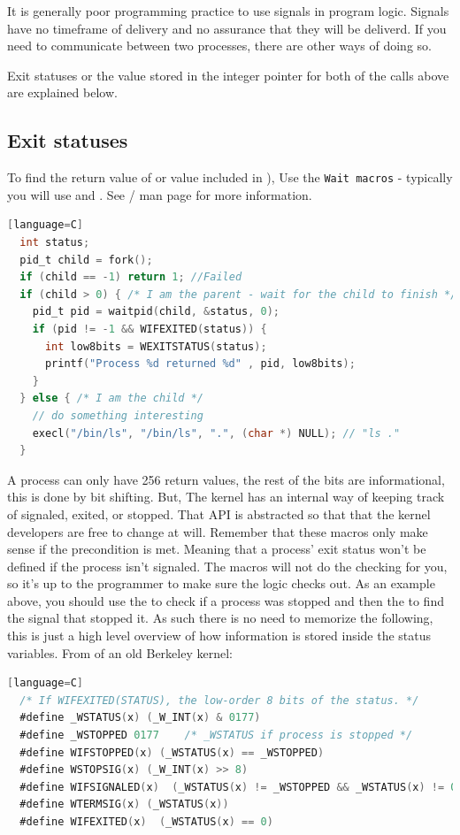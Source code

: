 It is generally poor programming practice to use signals in program logic.
Signals have no timeframe of delivery and no assurance that they will be deliverd.
If you need to communicate between two processes, there are other ways of doing so.

Exit statuses or the value stored in the integer pointer for both of the calls above are explained below.

\subsection{Exit statuses}

To find the return value of  or value included in ), Use the \texttt{Wait macros} - typically you will use  and  . See / man page for more information.

\begin{lstlisting}[language=C][language=C]
  int status;
  pid_t child = fork();
  if (child == -1) return 1; //Failed
  if (child > 0) { /* I am the parent - wait for the child to finish */
    pid_t pid = waitpid(child, &status, 0);
    if (pid != -1 && WIFEXITED(status)) {
      int low8bits = WEXITSTATUS(status);
      printf("Process %d returned %d" , pid, low8bits);
    }
  } else { /* I am the child */
    // do something interesting
    execl("/bin/ls", "/bin/ls", ".", (char *) NULL); // "ls ."
  }
\end{lstlisting}

A process can only have 256 return values, the rest of the bits are informational, this is done by bit shifting.
But, The kernel has an internal way of keeping track of signaled, exited, or stopped.
That API is abstracted so that that the kernel developers are free to change at will.
Remember that these macros only make sense if the precondition is met.
Meaning that a process' exit status won't be defined if the process isn't signaled.
The macros will not do the checking for you, so it's up to the programmer to make sure the logic checks out.
As an example above, you should use the  to check if a process was stopped and then the  to find the signal that stopped it.
As such there is no need to memorize the following, this is just a high level overview of how information is stored inside the status variables. From  of an old Berkeley kernel\cite{sys/wait.h}:

\begin{lstlisting}[language=C][language=C]
  /* If WIFEXITED(STATUS), the low-order 8 bits of the status. */
  #define _WSTATUS(x) (_W_INT(x) & 0177)
  #define _WSTOPPED 0177    /* _WSTATUS if process is stopped */
  #define WIFSTOPPED(x) (_WSTATUS(x) == _WSTOPPED)
  #define WSTOPSIG(x) (_W_INT(x) >> 8)
  #define WIFSIGNALED(x)  (_WSTATUS(x) != _WSTOPPED && _WSTATUS(x) != 0)
  #define WTERMSIG(x) (_WSTATUS(x))
  #define WIFEXITED(x)  (_WSTATUS(x) == 0)
\end{lstlisting}

